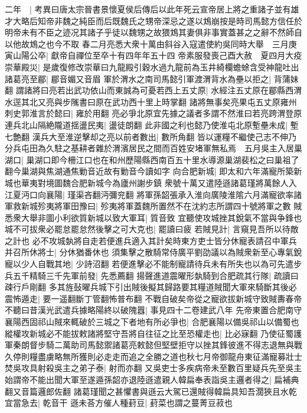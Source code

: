 二年　|{
	考異曰唐太宗晉書景懷夏侯后傳后以此年死云宣帝居上將之重諸子並有雄才大略后知帝非魏之純臣而后既魏氏之甥帝深忌之遂以鴆崩按是時司馬懿方信任於明帝未有不臣之迹况其諸子乎徒以魏甥之故猥鴆其妻俱非事實蓋甚之之辭不然師自以他故鴆之也今不取}
春二月亮悉大衆十萬由斜谷入寇遣使約吳同時大舉　三月庚寅山陽公卒|{
	獻帝自禪位至卒十有四年年五十四}
帝素服發喪己酉大赦　夏四月大疫　崇華殿災|{
	是歲復修改崇華曰九龍殿引穀水過九龍前為玉井綺欄蟾蜍含受神龍吐出}
諸葛亮至郿|{
	郿音媚又音眉}
軍於渭水之南司馬懿引軍渡渭背水為壘以拒之|{
	背蒲妹翻}
謂諸將曰亮若出武功依山而東誠為可憂若西上五丈原|{
	水經注五丈原在郿縣西渭水逕其北又亮與步隲書曰原在武功西十里上時掌翻}
諸將無事矣亮果屯五丈原雍州刺史郭淮言於懿曰|{
	雍於用翻}
亮必爭北原宜先據之議者多謂不然淮曰若亮跨渭登原連兵北山隔絶隴道揺盪民夷|{
	盪徒朗翻}
此非國之利也懿乃使淮屯北原塹壘未成|{
	塹七艶翻}
漢兵大至淮逆擊却之亮以前者數出|{
	數所角翻}
皆以運糧不繼使己志不伸乃分兵屯田為久駐之基耕者雜於渭濱居民之間而百姓安堵軍無私焉　五月吳主入居巢湖口|{
	巢湖口即今柵江口也在和州歷陽縣西南百五十里水導源巢湖裴松之曰巢祖了翻今巢湖與焦湖通焦勦音近故有勦音今讀如字}
向合肥新城|{
	即太和六年滿寵所築新城也華夷對境圖魏合肥新城今為廬州謝步鎮}
衆號十萬又遣陸遜諸葛瑾將萬餘人入江夏沔口向襄陽|{
	瑾渠吝翻沔彌兖翻}
將軍孫韶張承入淮向廣陵淮隂六月滿寵欲率諸軍救新城殄夷將軍田豫曰|{
	殄夷將軍蓋魏所置然不在沈約志所謂四十號將軍之數}
賊悉衆大舉非圖小利欲質新城以致大軍耳|{
	質音致}
宜聽使攻城挫其銳氣不當與争鋒也城不可拔衆必罷怠罷怠然後擊之可大克也|{
	罷讀曰疲}
若賊見計|{
	言窺見吾所以待敵之計也}
必不攻城埶將自走若便進兵適入其計矣時東方吏士皆分休寵表請召中軍兵并召所休將士|{
	分休猶番休也}
須集擊之散騎常侍廣平劉劭議以為賊衆新至心專氣銳寵以少人自戰其地|{
	少詩沼翻}
若便進擊必不能制寵請待兵未有所失也以為可先遣步兵五千精騎三千先軍前發|{
	先悉薦翻}
揚聲進道震曜形埶騎到合肥疏其行隊|{
	疏讀曰疎行戶剛翻}
多其旌鼔曜兵城下引出賊後擬其歸路要其糧道賊聞大軍來騎斷其後必震怖遁走|{
	要一遥翻斷丁管翻怖普布翻}
不戰自破矣帝從之寵欲拔新城守致賊夀春帝不聽曰昔漢光武遣兵據略陽終以破隗囂|{
	事見四十二卷建武八年}
先帝東置合肥南守襄陽西固祁山賊來輒破於三城之下者地有所必爭也|{
	合肥襄陽以備吳祁山以備蜀也}
縱權攻新城必不能拔敕諸將堅守吾將自往征之比至恐權走也|{
	比必寐翻}
乃使征蜀護軍秦朗督步騎二萬助司馬懿禦諸葛亮敕懿但堅壁拒守以挫其鋒彼進不得志退無與戰久停則糧盡虜略無所獲則必走走而追之全勝之道也秋七月帝御龍舟東征滿寵募壯士焚吳攻具射殺吳主之弟子泰|{
	射而亦翻}
又吳吏士多疾病帝未至數百里疑兵先至吳主始謂帝不能出聞大軍至遂遁孫韶亦退陸遜遣親人韓扁奉表詣吳主邏者得之|{
	扁補典翻又音篇邏郎佐翻}
諸葛瑾聞之甚懼書與遜云大駕已還賊得韓扁具知吾濶狹且水乾宜當急去|{
	乾音干}
遜未荅方催人種葑豆|{
	葑菜也謂之蔓菁豆菽也}

